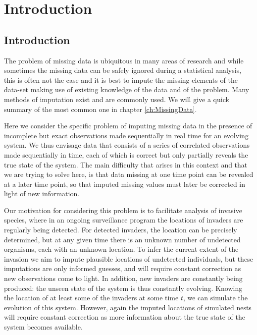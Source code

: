 \chapter[Introduction]{Introduction}
\label{ch:Introduction}

\section{Introduction}

The problem of missing data is ubiquitous in many areas of research and while sometimes the missing data can be safely ignored during a statistical analysis, this is often not the case and it is best to impute the missing elements of the data-set making use of existing knowledge of the data and of the problem. Many methods of imputation exist and are commonly used. We will give a quick summary of the most common one in chapter \ref{ch:MissingData}.

Here we consider the specific problem of imputing missing data in the presence of incomplete but exact observations made sequentially in real time for an evolving system. We thus envisage data that consists of a series of correlated observations made sequentially in time, each of which is correct but only partially reveals the true state of the system. The main difficulty that arises in this context and that we are trying to solve here, is that data missing at one time point can be revealed at a later time point, so that imputed missing values must later be corrected in light of new information.

Our motivation for considering this problem is to facilitate analysis of invasive species, where in an ongoing surveillance program the locations of invaders are regularly being detected. For detected invaders, the location can be precisely determined, but at any given time there is an unknown number of undetected organisms, each with an unknown location. To infer the current extent of the invasion we aim to impute plausible locations of undetected individuals, but these imputations are only informed guesses, and will require constant correction as new observations come to light. In addition, new invaders are constantly being produced: the unseen state of the system is thus constantly evolving. Knowing the location of at least some of the invaders at some time $t$, we can simulate the evolution of this system. However, again the imputed locations of simulated nests will require constant correction as more information about the true state of the system becomes available.

